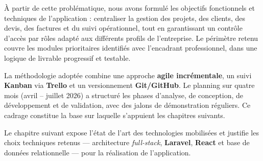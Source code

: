 \medskip

À partir de cette problématique, nous avons formulé les objectifs fonctionnels et
techniques de l'application : centraliser la gestion des projets, des clients, des
devis, des factures et du suivi opérationnel, tout en garantissant un contrôle
d'accès par rôles adapté aux différents profils de l'entreprise. Le périmètre retenu
couvre les modules prioritaires identifiés avec l'encadrant professionnel, dans une
logique de livrable progressif et testable.

\medskip

La méthodologie adoptée combine une approche \textbf{agile incrémentale}, un suivi
\textbf{Kanban} via \textbf{Trello} et un versionnement \textbf{Git/GitHub}.
Le planning sur quatre mois (avril -- juillet 2026) a structuré les phases d'analyse,
de conception, de développement et de validation, avec des jalons de démonstration
réguliers. Ce cadrage constitue la base sur laquelle s'appuient les chapitres
suivants.

\medskip

Le chapitre suivant expose l'état de l'art des technologies mobilisées et justifie
les choix techniques retenus --- architecture \textit{full-stack}, \textbf{Laravel},
\textbf{React} et base de données relationnelle --- pour la réalisation de
l'application.
